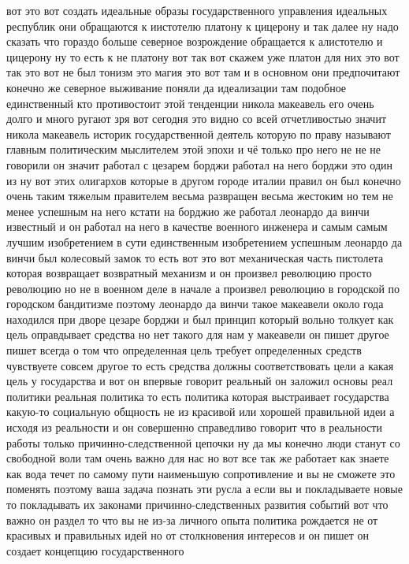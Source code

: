 вот это вот создать идеальные образы государственного управления идеальных
республик они обращаются к иистотелю платону к цицерону и так далее ну надо
сказать что гораздо больше северное возрождение обращается к алистотелю и
цицерону ну то есть к не платону вот так вот скажем уже платон для них это вот
так это вот не был тонизм это магия это вот там и в основном они предпочитают
конечно же северное выживание поняли да идеализации там подобное единственный
кто противостоит этой тенденции никола макеавель его очень долго и много ругают
зря вот сегодня это видно со всей отчетливостью значит никола макеавель историк
государственной деятель которую по праву называют главным политическим
мыслителем этой эпохи и чё только про него не не не говорили он значит работал с
цезарем борджи работал на него борджи это один из ну вот этих олигархов которые
в другом городе италии правил он был конечно очень таким тяжелым правителем
весьма развращен весьма жестоким но тем не менее успешным на него кстати на
борджио же работал леонардо да винчи известный и он работал на него в качестве
военного инженера и самым самым лучшим изобретением в сути единственным
изобретением успешным леонардо да винчи был колесовый замок то есть вот это вот
механическая часть пистолета которая возвращает возвратный механизм и он
произвел революцию просто революцию но не в военном деле в начале а произвел
революцию в городской по городском бандитизме поэтому леонардо да винчи такое
макеавели около года находился при дворе цезаре борджи и был принцип который
вольно толкует как цель оправдывает средства но нет такого для нам у макеавели
он пишет другое пишет всегда о том что определенная цель требует определенных
средств чувствуете совсем другое то есть средства должны соответствовать цели а
какая цель у государства и вот он впервые говорит реальный он заложил основы
реал политики реальная политика то есть политика которая выстраивает государства
какую-то социальную общность не из красивой или хорошей правильной идеи а исходя
из реальности и он совершенно справедливо говорит что в реальности работы только
причинно-следственной цепочки ну да мы конечно люди станут со свободной воли там
очень важно для нас но вот все так же работает как знаете как вода течет по
самому пути наименьшую сопротивление и вы не сможете это поменять поэтому ваша
задача познать эти русла а если вы и покладываете новые то покладывать их
законами причинно-следственных развития событий вот что важно он раздел то что
вы не из-за личного опыта политика рождается не от красивых и правильных идей но
от столкновения интересов и он пишет он создает концепцию государственного
